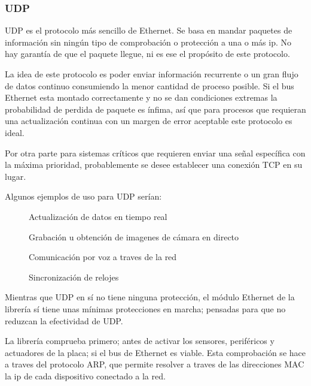 \documentclass{report}
\begin{document}
\subsubsection{UDP}
UDP es el protocolo más sencillo de Ethernet. Se basa en mandar paquetes de información sin ningún tipo de comprobación o protección a una o más ip. No hay garantía de que el paquete llegue, ni es ese el propósito de este protocolo. 
\par \vspace{0.3cm}
La idea de este protocolo es poder enviar información recurrente o un gran flujo de datos continuo consumiendo la menor cantidad de proceso posible. Si el bus Ethernet esta montado correctamente y no se dan condiciones extremas la probabilidad de perdida de paquete es ínfima, así que para procesos que requieran una actualización continua con un margen de error aceptable este protocolo es ideal. 
\par \vspace{0.3cm}
Por otra parte para sistemas críticos que requieren enviar una señal específica con la máxima prioridad, probablemente se desee establecer una conexión TCP en su lugar. 
\par \vspace{0.3cm}
Algunos ejemplos de uso para UDP serían:
\begin{figure}[H]
\cdot \hspace{0.1cm} Actualización de datos en tiempo real \par
\cdot \hspace{0.1cm} Grabación u obtención de imagenes de cámara en directo \par
\cdot \hspace{0.1cm} Comunicación por voz a traves de la red \par
\cdot \hspace{0.1cm} Sincronización de relojes 
\label{UDPuses}
\end{figure}
\par \vspace{0.3cm}
Mientras que UDP en sí no tiene ninguna protección, el módulo Ethernet de la librería sí tiene unas mínimas protecciones en marcha; pensadas para que no reduzcan la efectividad de UDP.
\par
La librería comprueba primero; antes de activar los sensores, periféricos y actuadores de la placa; si el bus de Ethernet es viable. Esta comprobación se hace a traves del protocolo ARP, que permite resolver a traves de las direcciones MAC la ip de cada dispositivo conectado a la red. 
\end{document}
